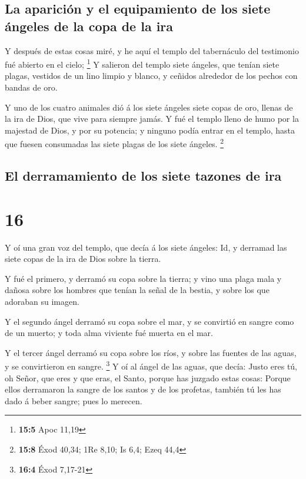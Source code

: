 \hypertarget{la-apariciuxf3n-y-el-equipamiento-de-los-siete-uxe1ngeles-de-la-copa-de-la-ira}{%
\subsection{La aparición y el equipamiento de los siete ángeles de la
copa de la
ira}\label{la-apariciuxf3n-y-el-equipamiento-de-los-siete-uxe1ngeles-de-la-copa-de-la-ira}}

 Y después de estas cosas miré, y he aquí el templo del
tabernáculo del testimonio fué abierto en el cielo; \footnote{\textbf{15:5}
  Apoc 11,19}  Y salieron del templo siete ángeles, que
tenían siete plagas, vestidos de un lino limpio y blanco, y ceñidos
alrededor de los pechos con bandas de oro.

 Y uno de los cuatro animales dió á los siete ángeles
siete copas de oro, llenas de la ira de Dios, que vive para siempre
jamás.  Y fué el templo lleno de humo por la majestad de
Dios, y por su potencia; y ninguno podía entrar en el templo, hasta que
fuesen consumadas las siete plagas de los siete ángeles. \footnote{\textbf{15:8}
  Éxod 40,34; 1Re 8,10; Is 6,4; Ezeq 44,4}

\hypertarget{el-derramamiento-de-los-siete-tazones-de-ira}{%
\subsection{El derramamiento de los siete tazones de
ira}\label{el-derramamiento-de-los-siete-tazones-de-ira}}

\hypertarget{section-15}{%
\section{16}\label{section-15}}

 Y oí una gran voz del templo, que decía á los siete
ángeles: Id, y derramad las siete copas de la ira de Dios sobre la
tierra.

 Y fué el primero, y derramó su copa sobre la tierra; y
vino una plaga mala y dañosa sobre los hombres que tenían la señal de la
bestia, y sobre los que adoraban su imagen.

 Y el segundo ángel derramó su copa sobre el mar, y se
convirtió en sangre como de un muerto; y toda alma viviente fué muerta
en el mar.

 Y el tercer ángel derramó su copa sobre los ríos, y sobre
las fuentes de las aguas, y se convirtieron en sangre. \footnote{\textbf{16:4}
  Éxod 7,17-21}  Y oí al ángel de las aguas, que decía:
Justo eres tú, oh Señor, que eres y que eras, el Santo, porque has
juzgado estas cosas:  Porque ellos derramaron la sangre de
los santos y de los profetas, también tú les has dado á beber sangre;
pues lo merecen.

